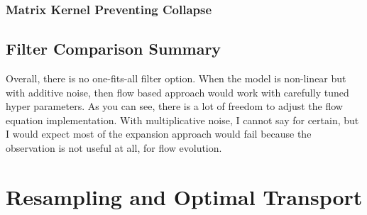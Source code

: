 \documentclass{article}
\begin{document}
\newpage

\subsubsection{Matrix Kernel Preventing Collapse}

\subsection{Filter Comparison Summary}
Overall, there is no one-fits-all filter option. When the model is non-linear but with additive noise, then flow based approach would work with carefully tuned hyper parameters. As you can see, there is a lot of freedom to adjust the flow equation implementation. With multiplicative noise, I cannot say for certain, but I would expect most of the expansion approach would fail because the observation is not useful at all, for flow evolution. 


\newpage

\newpage
\section{Resampling and Optimal Transport}
\end{document}
